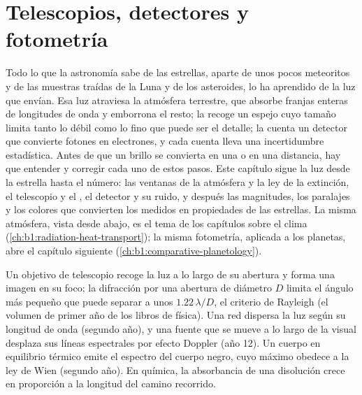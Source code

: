 \chapter{Telescopios, detectores y fotometría}\label{ch:b1:observing-the-sky}

Todo lo que la astronomía sabe de las estrellas, aparte de unos pocos meteoritos y
de las muestras traídas de la Luna y de los asteroides, lo ha aprendido de la luz
que envían. Esa luz atraviesa la atmósfera terrestre, que absorbe franjas enteras de
longitudes de onda y emborrona el resto; la recoge un espejo cuyo tamaño limita
tanto lo débil como lo fino que puede ser el detalle; la cuenta un detector que
convierte fotones en electrones, y cada cuenta lleva una incertidumbre estadística.
Antes de que un brillo se convierta en una  o en una distancia, hay que
entender y corregir cada uno de estos pasos. Este capítulo sigue la luz desde la
estrella hasta el número: las ventanas de la atmósfera y la ley de la extinción, el
telescopio y el , el detector y su ruido, y después las magnitudes, los
paralajes y los colores que convierten los  medidos en propiedades de las
estrellas. La misma atmósfera, vista desde abajo, es el tema de los capítulos sobre
el clima (\cref{ch:b1:radiation-heat-transport}); la misma fotometría, aplicada a los
planetas, abre el capítulo siguiente (\cref{ch:b1:comparative-planetology}).

\begin{recall}
Un objetivo de telescopio recoge la luz a lo largo de su abertura y forma una imagen
en su foco; la difracción por una abertura de diámetro $D$ limita el ángulo más
pequeño que puede separar a unos $1.22\,\lambda/D$, el criterio de Rayleigh (el
volumen de primer año de los libros de física). Una red dispersa la luz según su
longitud de onda (segundo año), y una fuente que se mueve a lo largo de la visual
desplaza sus líneas espectrales por efecto Doppler (año 12). Un cuerpo en equilibrio
térmico emite el espectro del cuerpo negro, cuyo máximo obedece a la ley de Wien
(segundo año). En química, la absorbancia de una disolución crece en proporción a la
longitud del camino recorrido.
\end{recall}

